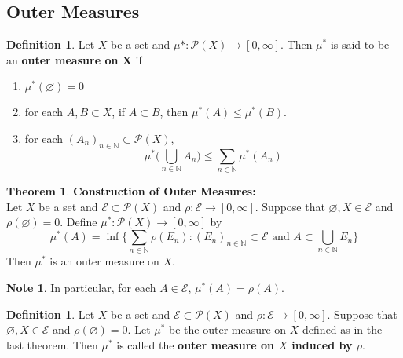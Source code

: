 \documentclass[12pt]{amsart}
\theoremstyle{definition}
\newtheorem{defn}[definition]{Definition}
\newtheorem{note}[definition]{Note}
\newtheorem{thm}[definition]{Theorem}
\newcommand{\N}{\mathbb{N}}
\newcommand{\MP}{\mathcal{P}}
\newcommand{\ME}{\mathcal{E}}
\newcommand{\ld}[1]{\label{defn:#1}}
\begin{document}
	
	
	
	
	
	
	
	
	
	
	
	
	
	
	
	
	\newpage
	\subsection{Outer Measures}
	
	\begin{defn} \ld{00000} 
		Let $X$ be a set and $\mu* : \MP(X) \rightarrow [0, \infty]$. Then $\mu^*$ is said to be an \textbf{outer measure on X} if 
		\begin{enumerate}
			\item $\mu^*(\varnothing) = 0$
			\item for each $A,B \subset X $, if $A \subset B$, then $\mu^*(A) \leq \mu^*(B)$.
			\item for each $(A_n)_{n \in \N} \subset \MP(X)$, $$\mu^*\big(\bigcup\limits_{n \in \N} A_n\big) \leq \sum\limits_{n \in \N}\mu^*(A_n) $$
		\end{enumerate}
	\end{defn}
	
	\begin{thm}\textbf{Construction of Outer Measures:} \\
		Let $X$ be a set and $\ME \subset \MP(X)$ and $\rho: \ME \rightarrow [0, \infty]$. Suppose that $\varnothing, X \in \ME$ and $\rho(\varnothing) = 0$. Define $\mu^*:\MP(X) \rightarrow [0, \infty]$ by $$\mu^*(A) = \inf \bigg \{\sum_{n \in \N}\rho(E_n): (E_n)_{n \in \N} \subset \ME \text{ and }A \subset \bigcup_{n \in \N}E_n \bigg \}$$ Then $\mu^*$ is an outer measure on $X$.
	\end{thm}
	
	\begin{note}
		In particular, for each $A \in \ME$, $\mu^*(A) = \rho(A)$.
	\end{note}
	
	\begin{defn} \ld{00000} 
		Let $X$ be a set and $\ME \subset \MP(X)$ and $\rho: \ME \rightarrow [0, \infty]$. Suppose that $\varnothing, X \in \ME$ and $\rho(\varnothing) = 0$. Let $\mu^*$ be the outer measure on $X$ defined as in the last theorem. Then $\mu^*$ is called the \textbf{outer measure on $X$ induced by $\rho$}.
	\end{defn}
	
\end{document}
